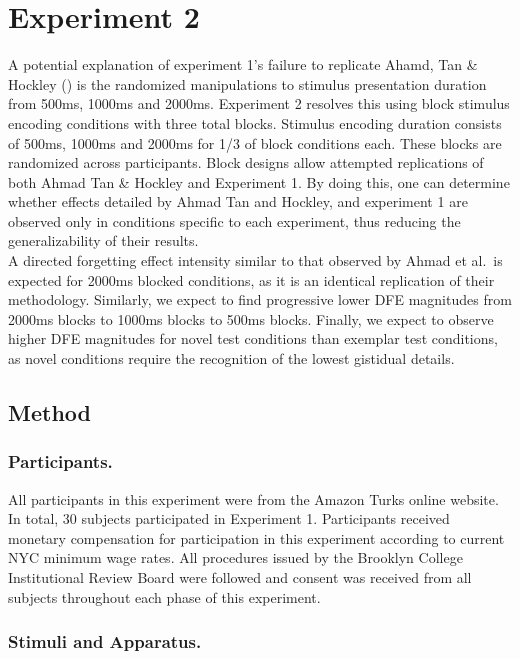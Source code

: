 \documentclass[
  man,floatsintext]{apa6}
\begin{document}
\hypertarget{experiment-2}{%
\section{Experiment 2}\label{experiment-2}}

A potential explanation of experiment 1's failure to replicate Ahamd, Tan \& Hockley () is the randomized manipulations to stimulus presentation duration from 500ms, 1000ms and 2000ms. Experiment 2 resolves this using block stimulus encoding conditions with three total blocks. Stimulus encoding duration consists of 500ms, 1000ms and 2000ms for 1/3 of block conditions each. These blocks are randomized across participants. Block designs allow attempted replications of both Ahmad Tan \& Hockley and Experiment 1. By doing this, one can determine whether effects detailed by Ahmad Tan and Hockley, and experiment 1 are observed only in conditions specific to each experiment, thus reducing the generalizability of their results.\\
A directed forgetting effect intensity similar to that observed by Ahmad et al.~is expected for 2000ms blocked conditions, as it is an identical replication of their methodology. Similarly, we expect to find progressive lower DFE magnitudes from 2000ms blocks to 1000ms blocks to 500ms blocks. Finally, we expect to observe higher DFE magnitudes for novel test conditions than exemplar test conditions, as novel conditions require the recognition of the lowest gistidual details.

\hypertarget{method-1}{%
\subsection{Method}\label{method-1}}

\hypertarget{participants.-1}{%
\subsubsection{Participants.}\label{participants.-1}}

All participants in this experiment were from the Amazon Turks online website. In total, 30 subjects participated in Experiment 1. Participants received monetary compensation for participation in this experiment according to current NYC minimum wage rates. All procedures issued by the Brooklyn College Institutional Review Board were followed and consent was received from all subjects throughout each phase of this experiment.

\hypertarget{stimuli-and-apparatus.-1}{%
\subsubsection{Stimuli and Apparatus.}\label{stimuli-and-apparatus.-1}}
\end{document}
